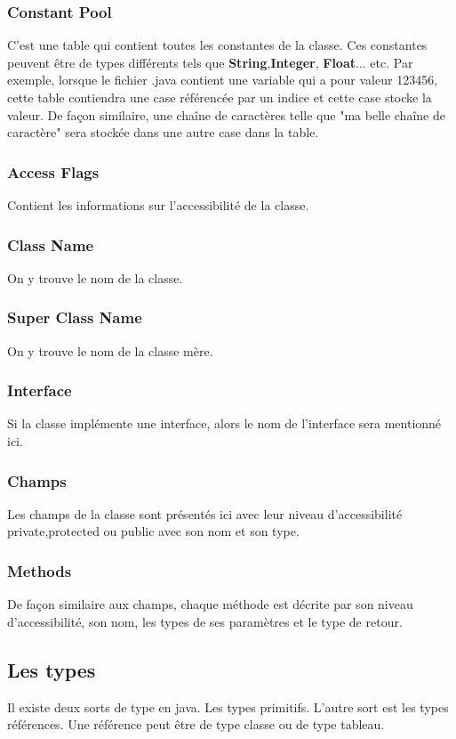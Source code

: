 \documentclass[12pt, a4paper, one side]{article}
\begin{document}
    \subsubsection{Constant Pool}
    C'est une table qui contient toutes les constantes de la classe. Ces constantes peuvent être de types différents tels que \textbf{String},\textbf{Integer}, \textbf{Float}... etc. Par exemple, lorsque le fichier .java contient une variable qui a pour valeur 123456, cette table contiendra une case référencée par un indice et cette case stocke la valeur. De façon similaire, une chaîne de caractères telle que "ma belle chaîne de caractère" sera stockée dans une autre case dans la table.

    \subsubsection{Access Flags}
    Contient les informations sur l'accessibilité de la classe.

    \subsubsection{Class Name}
    On y trouve le nom de la classe.
    \subsubsection{Super Class Name}
    On y trouve le nom de la classe mère.

    \subsubsection{Interface}
    Si la classe implémente une interface, alors le nom de l'interface sera mentionné ici.

    \subsubsection{Champs}
    Les champs de la classe sont présentés ici avec leur niveau d'accessibilité private,protected ou public avec son nom et son type.

    \subsubsection{Methods}
    De façon similaire aux champs, chaque méthode est décrite par son niveau d'accessibilité, son nom, les types de ses paramètres et le type de retour.

    \subsection{Les types}
    Il existe deux sorts de type en java. Les types primitifs. L'autre sort est les types références. Une référence peut être de type classe ou de type tableau.
    \\
\end{document}
